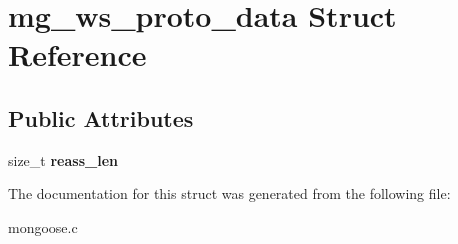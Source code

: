\hypertarget{structmg__ws__proto__data}{}\section{mg\+\_\+ws\+\_\+proto\+\_\+data Struct Reference}
\label{structmg__ws__proto__data}
\subsection*{Public Attributes}
\begin{DoxyCompactItemize}
\item 
\mbox{\label{structmg__ws__proto__data_abde1bef4413f8b6917e4da944e47447c}} 
size\+\_\+t {\bfseries reass\+\_\+len}
\end{DoxyCompactItemize}


The documentation for this struct was generated from the following file\+:\begin{DoxyCompactItemize}
\item 
mongoose.\+c\end{DoxyCompactItemize}
